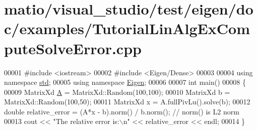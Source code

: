 \hypertarget{matio_2visual__studio_2test_2eigen_2doc_2examples_2_tutorial_lin_alg_ex_compute_solve_error_8cpp_source}{}\section{matio/visual\+\_\+studio/test/eigen/doc/examples/\+Tutorial\+Lin\+Alg\+Ex\+Compute\+Solve\+Error.cpp}
\label{matio_2visual__studio_2test_2eigen_2doc_2examples_2_tutorial_lin_alg_ex_compute_solve_error_8cpp_source}

\begin{DoxyCode}
00001 \textcolor{preprocessor}{#include <iostream>}
00002 \textcolor{preprocessor}{#include <Eigen/Dense>}
00003 
00004 \textcolor{keyword}{using namespace }\hyperlink{namespacestd}{std};
00005 \textcolor{keyword}{using namespace }\hyperlink{namespace_eigen}{Eigen};
00006 
00007 \textcolor{keywordtype}{int} main()
00008 \{
00009    MatrixXd \hyperlink{group___core___module_class_eigen_1_1_matrix}{A} = MatrixXd::Random(100,100);
00010    MatrixXd b = MatrixXd::Random(100,50);
00011    MatrixXd x = A.fullPivLu().solve(b);
00012    \textcolor{keywordtype}{double} relative\_error = (A*x - b).norm() / b.norm(); \textcolor{comment}{// norm() is L2 norm}
00013    cout << \textcolor{stringliteral}{"The relative error is:\(\backslash\)n"} << relative\_error << endl;
00014 \}
\end{DoxyCode}
